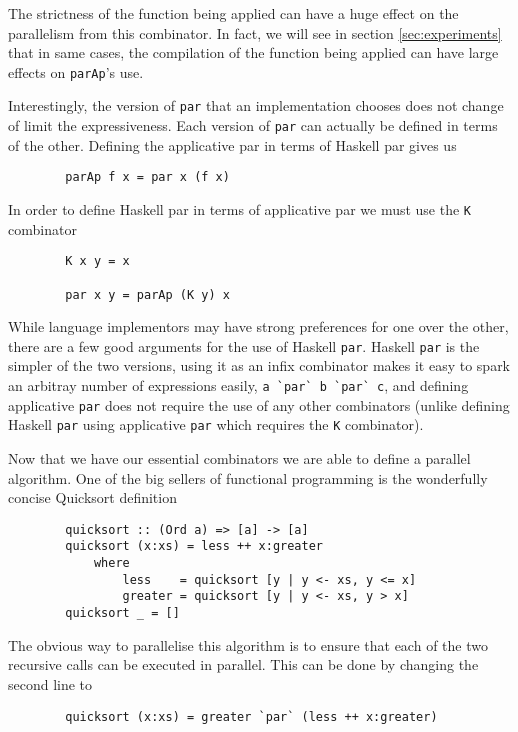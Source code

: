 The strictness of the function being applied can have a huge effect on the
parallelism from this combinator. In fact, we will see in section
\ref{sec:experiments} that in same cases, the compilation of the
function being applied can have large effects on \verb=parAp='s use.

Interestingly, the version of \verb=par= that an implementation chooses does not
change of limit the expressiveness. Each version of \verb-par- can actually be
defined in terms of the other. Defining the applicative par in terms of Haskell
par gives us

\begin{verbatim}
        parAp f x = par x (f x)
\end{verbatim}

In order to define Haskell par in terms of applicative par we must use the
\verb=K= combinator

\begin{verbatim}
        K x y = x

        par x y = parAp (K y) x
\end{verbatim}

While language implementors may have strong preferences for one over the other,
there are a few good arguments for the use of Haskell \verb=par=. Haskell
\verb=par= is the simpler of the two versions, using it as an infix combinator
makes it easy to spark an arbitray number of expressions easily,
\verb-a `par` b `par` c-, and defining applicative \verb=par= does not require
the use of any other combinators (unlike defining Haskell \verb=par= using
applicative \verb=par= which requires the \verb=K= combinator).

    Now that we have our essential combinators we are able to define a parallel
algorithm. One of the big sellers of functional programming is the wonderfully
concise Quicksort definition

\begin{lstlisting}
        quicksort :: (Ord a) => [a] -> [a]
        quicksort (x:xs) = less ++ x:greater
            where
                less    = quicksort [y | y <- xs, y <= x]
                greater = quicksort [y | y <- xs, y > x]
        quicksort _ = []
\end{lstlisting}

The obvious way to parallelise this algorithm is to ensure that each of the two
recursive calls can be executed in parallel. This can be done by changing the second
line to

\begin{verbatim}
        quicksort (x:xs) = greater `par` (less ++ x:greater)
\end{verbatim}

